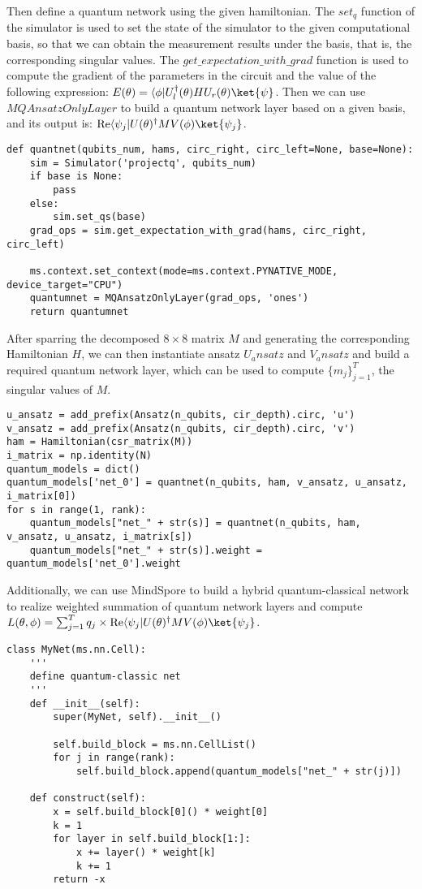 Then define a quantum network using the given hamiltonian. The $set_q$ function of the simulator is used to set the state of the simulator to the given computational basis, so that we can obtain the measurement results under the basis, that is, the corresponding singular values. The $get\_expectation\_with\_grad$ function is used to compute the gradient of the parameters in the circuit and the value of the following expression: $E(\theta) = \langle\phi| U_l^{\dagger}(\theta) H U_r(\theta)\ket{\psi}$. Then we can use $MQAnsatzOnlyLayer$ to build a quantum network layer based on a given basis, and its output is: $\text{Re}\langle\psi_j|U(\theta)^{\dagger} M V(\phi)\ket{\psi_j}$. 
\begin{lstlisting}
def quantnet(qubits_num, hams, circ_right, circ_left=None, base=None):
    sim = Simulator('projectq', qubits_num)
    if base is None:
        pass
    else:
        sim.set_qs(base)
    grad_ops = sim.get_expectation_with_grad(hams, circ_right, circ_left)

    ms.context.set_context(mode=ms.context.PYNATIVE_MODE, device_target="CPU")
    quantumnet = MQAnsatzOnlyLayer(grad_ops, 'ones')
    return quantumnet
\end{lstlisting}
After sparring the decomposed $8 \times 8$ matrix $M$ and generating the corresponding Hamiltonian $H$, we can then instantiate ansatz $U_ansatz$ and $V_ansatz$ and build a required quantum network layer, which can be used to compute $\{m_j\}_{j=1}^T$, the singular values of $M$. 
\begin{lstlisting}
u_ansatz = add_prefix(Ansatz(n_qubits, cir_depth).circ, 'u')
v_ansatz = add_prefix(Ansatz(n_qubits, cir_depth).circ, 'v')
ham = Hamiltonian(csr_matrix(M))
i_matrix = np.identity(N)
quantum_models = dict()
quantum_models['net_0'] = quantnet(n_qubits, ham, v_ansatz, u_ansatz, i_matrix[0])
for s in range(1, rank):
    quantum_models["net_" + str(s)] = quantnet(n_qubits, ham, v_ansatz, u_ansatz, i_matrix[s])
    quantum_models["net_" + str(s)].weight = quantum_models['net_0'].weight
\end{lstlisting}
Additionally, we can use MindSpore to build a hybrid quantum-classical network to realize weighted summation of quantum network layers and compute $L(\theta,\phi) = \sum_{j=1}^T q_j \times \text{Re} \langle\psi_j| U(\theta)^{\dagger} M V(\phi)\ket{\psi_j}$. 
\begin{lstlisting}
class MyNet(ms.nn.Cell):
    '''
    define quantum-classic net
    '''
    def __init__(self):
        super(MyNet, self).__init__()

        self.build_block = ms.nn.CellList()
        for j in range(rank):
            self.build_block.append(quantum_models["net_" + str(j)])

    def construct(self):
        x = self.build_block[0]() * weight[0]
        k = 1
        for layer in self.build_block[1:]:
            x += layer() * weight[k]
            k += 1
        return -x
\end{lstlisting}
